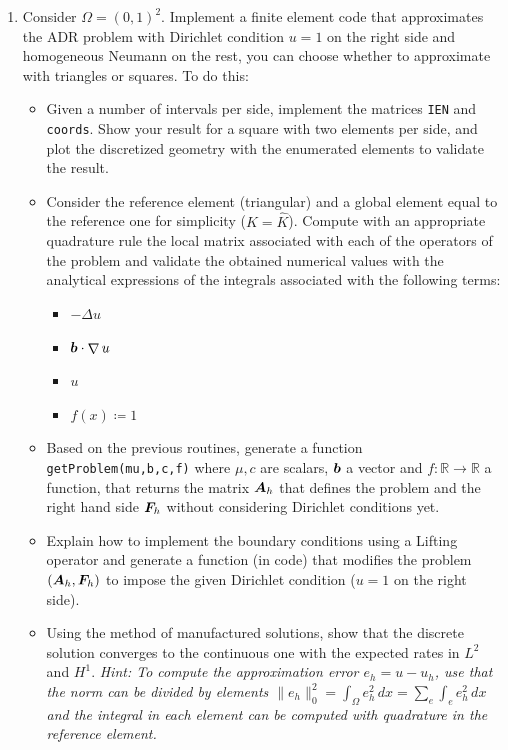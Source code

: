 \documentclass{article}
\renewcommand{\vec}{\vectorsym}
\newcommand{\mat}{\matrixsym}
\DeclareMathOperator{\grad}{\nabla}
\newcommand{\R}{\mathbb{R}}
\begin{document}
\begin{enumerate}
    \item Consider $\Omega = (0,1)^2$. Implement a finite element code that approximates the ADR problem with Dirichlet condition $u=1$ on the right side and homogeneous Neumann on the rest, you can choose whether to approximate with triangles or squares. To do this: 
            \begin{itemize}
                \item{} Given a number of intervals per side, implement the matrices \texttt{IEN} and \texttt{coords}. Show your result for a square with two elements per side, and plot the discretized geometry with the enumerated elements to validate the result.
                \item Consider the reference element (triangular) and a global element equal to the reference one for simplicity ($K = \hat K$). Compute with an appropriate quadrature rule the local matrix associated with each of the operators of the problem and validate the obtained numerical values with the analytical expressions of the integrals associated with the following terms: 
                    \begin{itemize}
                        \item{} $-\Delta u$
                        \item{} $\vec b \cdot \grad u$
                        \item{} $u$
                        \item{} $f(x)\coloneqq 1$
                    \end{itemize}

                \item{} Based on the previous routines, generate a function \texttt{getProblem(mu,b,c,f)} where $\mu,c$ are scalars, $\vec b$ a vector and $f:\R\to\R$ a function, that returns the matrix $\mat A_h$ that defines the problem and the right hand side $\vec F_h$ without considering Dirichlet conditions yet.
                \item{} Explain how to implement the boundary conditions using a Lifting operator and generate a function (in code) that modifies the problem $(\mat A_h, \vec F_h)$ to impose the given Dirichlet condition ($u=1$ on the right side).
                \item{} Using the method of manufactured solutions, show that the discrete solution converges to the continuous one with the expected rates in $L^2$ and $H^1$. \emph{Hint: To compute the approximation error $e_h = u - u_h$, use that the norm can be divided by elements $\|e_h\|_0^2 = \int_\Omega e_h^2\,dx = \sum_e \int_e e_h^2\,dx$ and the integral in each element can be computed with quadrature in the reference element.}
            \end{itemize}


\end{enumerate}
\end{document}
